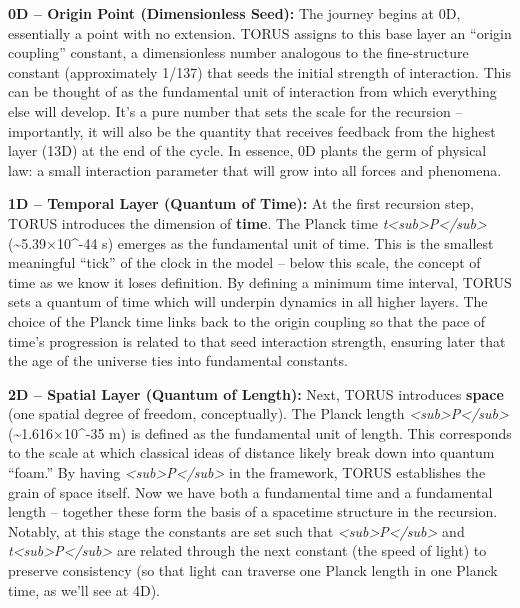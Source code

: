 \documentclass[
]{article}
\begin{document}
\textbf{0D -- Origin Point (Dimensionless Seed):} The journey begins at
0D, essentially a point with no extension. TORUS assigns to this base
layer an ``origin coupling'' constant, a dimensionless number analogous
to the fine-structure constant (approximately 1/137) that seeds the
initial strength of interaction. This can be thought of as the
fundamental unit of interaction from which everything else will develop.
It's a pure number that sets the scale for the recursion -- importantly,
it will also be the quantity that receives feedback from the highest
layer (13D) at the end of the cycle. In essence, 0D plants the germ of
physical law: a small interaction parameter that will grow into all
forces and phenomena.

\textbf{1D -- Temporal Layer (Quantum of Time):} At the first recursion
step, TORUS introduces the dimension of \textbf{time}. The Planck time
\emph{t\textless sub\textgreater P\textless/sub\textgreater{}}
(\textasciitilde5.39×10\^{}-44 s) emerges as the fundamental unit of
time. This is the smallest meaningful ``tick'' of the clock in the model
-- below this scale, the concept of time as we know it loses definition.
By defining a minimum time interval, TORUS sets a quantum of time which
will underpin dynamics in all higher layers. The choice of the Planck
time links back to the origin coupling so that the pace of time's
progression is related to that seed interaction strength, ensuring later
that the age of the universe ties into fundamental constants.

\textbf{2D -- Spatial Layer (Quantum of Length):} Next, TORUS introduces
\textbf{space} (one spatial degree of freedom, conceptually). The Planck
length \emph{\ell\textless sub\textgreater P\textless/sub\textgreater{}}
(\textasciitilde1.616×10\^{}-35 m) is defined as the fundamental unit of
length. This corresponds to the scale at which classical ideas of
distance likely break down into quantum ``foam.'' By having
\emph{\ell\textless sub\textgreater P\textless/sub\textgreater{}} in the
framework, TORUS establishes the grain of space itself. Now we have both
a fundamental time and a fundamental length -- together these form the
basis of a spacetime structure in the recursion. Notably, at this stage
the constants are set such that
\emph{\ell\textless sub\textgreater P\textless/sub\textgreater{}} and
\emph{t\textless sub\textgreater P\textless/sub\textgreater{}} are
related through the next constant (the speed of light) to preserve
consistency (so that light can traverse one Planck length in one Planck
time, as we'll see at 4D).
\end{document}

